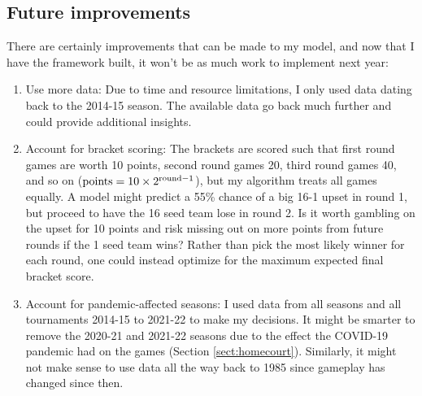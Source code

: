 \documentclass[twocolumn]{aastex63}
\begin{document}
\subsection{Future improvements}
There are certainly improvements that can be made to my model, and now that I have the framework built, it won't be as much work to implement next year:
\begin{enumerate}
\item Use more data: Due to time and resource limitations, I only used data dating back to the 2014-15 season. The available data go back much further and could provide additional insights.
\item Account for bracket scoring: The brackets are scored such that first round games are worth 10 points, second round games 20, third round games 40, and so on (${\rm points} = 10\times 2^{{\rm round}-1}$), but my algorithm treats all games equally. A model might predict a 55\% chance of a big 16-1 upset in round 1, but proceed to have the 16 seed team lose in round 2. Is it worth gambling on the upset for 10 points and risk missing out on more points from future rounds if the 1 seed team wins? Rather than pick the most likely winner for each round, one could instead optimize for the maximum expected final bracket score.
\item Account for pandemic-affected seasons: I used data from all seasons and all tournaments 2014-15 to 2021-22 to make my decisions. It might be smarter to remove the 2020-21 and 2021-22 seasons due to the effect the COVID-19 pandemic had on the games (Section \ref{sect:homecourt}). Similarly, it might not make sense to use data all the way back to 1985 since gameplay has changed since then.
\end{enumerate}








\end{document}
